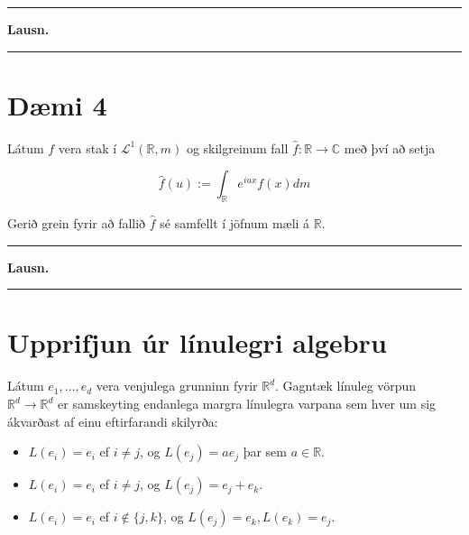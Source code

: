 \documentclass[]{book}
\begin{document}
\begin{center}\rule{0.5\linewidth}{\linethickness}\end{center}

\textbf{Lausn.}

\begin{center}\rule{0.5\linewidth}{\linethickness}\end{center}

\hypertarget{dmi-4-5}{%
\section*{Dæmi 4}\label{dmi-4-5}}

Látum \(f\) vera stak í \(\mathcal L^1(\mathbb R,m)\) og skilgreinum fall \(\hat f:\mathbb R\rightarrow \mathbb C\) með því að setja

\[
\hat f(u):= \int_\mathbb R e^{iux}f(x)dm
\]

Gerið grein fyrir að fallið \(\hat f\) sé samfellt í jöfnum mæli á \(\mathbb R\).

\begin{center}\rule{0.5\linewidth}{\linethickness}\end{center}

\textbf{Lausn.}

\begin{center}\rule{0.5\linewidth}{\linethickness}\end{center}

\hypertarget{upprifjun-ur-linulegri-algebru}{%
\section*{Upprifjun úr línulegri algebru}\label{upprifjun-ur-linulegri-algebru}}

Látum \(e_1, \dots, e_d\) vera venjulega grunninn fyrir \(\mathbb R^d\). Gagntæk línuleg vörpun \(\mathbb R^d\rightarrow\mathbb R^d\) er samskeyting endanlega margra línulegra varpana sem hver um sig ákvarðast af einu eftirfarandi skilyrða:

\begin{itemize}
\item
  \(L(e_i) = e_i\) ef \(i\neq j\), og \(L(e_j) = ae_j\) þar sem \(a\in\mathbb R\).
\item
  \(L(e_i) = e_i\) ef \(i\neq j\), og \(L(e_j) = e_j + e_k\).
\item
  \(L(e_i) = e_i\) ef \(i\not\in \{j,k\}\), og \(L(e_j) = e_k, L(e_k)=e_j\).
\end{itemize}
\end{document}
